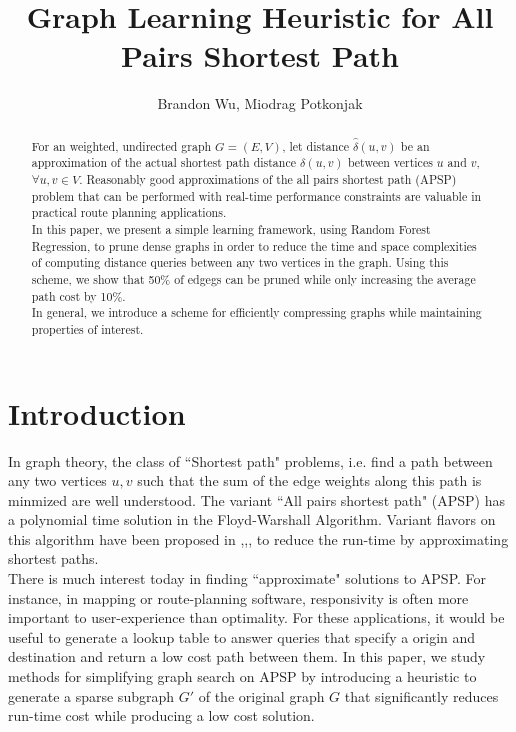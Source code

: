 \documentclass[10.5pt,journal]{IEEEtran}
\begin{document}
%
\title{Graph Learning Heuristic for All Pairs Shortest Path}
\author{Brandon Wu, Miodrag Potkonjak}
\maketitle

\begin{abstract}
For an weighted, undirected graph $G = (E,V)$, let distance $\hat{\delta}(u,v)$ be an approximation of the actual
shortest path distance $\delta(u,v)$ between vertices $u$ and $v$, $\forall u,v\in V$. Reasonably good
approximations of the all pairs shortest path (APSP) problem that can be performed with 
real-time performance constraints are valuable in practical route planning applications.\\

In this paper, we present a simple learning framework, using Random Forest Regression, to prune dense graphs
in order to reduce the time and space complexities of computing distance queries between any two vertices in
the graph. Using this scheme, we show that 50\% of edgegs can be pruned while only increasing the average
path cost by 10\%.\\

In general, we introduce a scheme for efficiently compressing graphs while maintaining properties of interest.
\end{abstract}

\section{Introduction}
In graph theory, the class of ``Shortest path" problems, i.e. find a path between any two vertices $u,v$ such
that the sum of the edge weights along this path is minmized are well understood. The variant ``All pairs
shortest path" (APSP) has a polynomial time solution in the Floyd-Warshall Algorithm.
Variant flavors on this algorithm have been proposed in 
\cite{approx1},\cite{approx2},\cite{neuralNet},\cite{astar}
to reduce the run-time by approximating shortest paths. \\

There is much interest today in finding ``approximate" solutions to APSP. For instance, in mapping or route-planning
software, responsivity is often more important to user-experience than optimality. For these applications, it would
be useful to generate a lookup table to answer queries that specify a origin and destination and return a
low cost path between them. In this paper, we study methods for simplifying graph search on APSP by introducing
a heuristic to generate a sparse subgraph $G'$ of the original graph $G$ that significantly reduces run-time
cost while producing a low cost solution.
\end{document}
